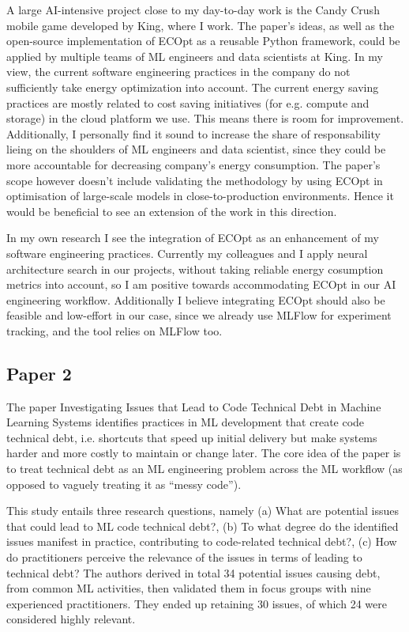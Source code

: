 \documentclass[11pt]{article}
\begin{document}
A large AI-intensive project close to my day-to-day work is the Candy Crush mobile game developed by King, where I work. The paper's ideas, as well as the open-source implementation of ECOpt as a reusable Python framework, could be applied by multiple teams of ML engineers and data scientists at King. In my view, the current software engineering practices in the company do not sufficiently take energy optimization into account. The current energy saving practices are mostly related to cost saving initiatives (for e.g. compute and storage) in the cloud platform we use. This means there is room for improvement. Additionally, I personally find it sound to increase the share of responsability lieing on the shoulders of ML engineers and data scientist, since they could be more accountable for decreasing company's energy consumption. The paper's scope however doesn't include validating the methodology by using ECOpt in optimisation of large-scale models in close-to-production environments. Hence it would be beneficial to see an extension of the work in this direction. 

In my own research I see the integration of ECOpt as an enhancement of my software engineering practices. Currently my colleagues and I apply neural architecture search in our projects, without taking reliable energy cosumption metrics into account, so I am positive towards accommodating ECOpt in our AI engineering workflow. Additionally I believe integrating ECOpt should also be feasible and low-effort in our case, since we already use MLFlow for experiment tracking, and the tool relies on MLFlow too.

\subsection{Paper 2} \label{ch:paper2}

The paper Investigating Issues that Lead to Code Technical Debt in Machine Learning Systems \citep{paper2} identifies practices in ML development that create code technical debt, i.e. shortcuts that speed up initial delivery but make systems harder and more costly to maintain or change later. The core idea of the paper is to treat technical debt as an ML engineering problem across the ML workflow (as opposed to vaguely treating it as “messy code”).

This study entails three research questions, namely (a) What are potential issues that could lead to ML code technical debt?, (b) To what degree do the identified issues manifest in practice, contributing to code-related technical debt?, (c) How do practitioners perceive the relevance of the issues in terms of leading to technical debt? The authors derived in total 34 potential issues causing debt, from common ML activities, then validated them in focus groups with nine experienced practitioners. They ended up retaining 30 issues, of which 24 were considered highly relevant.
\end{document}
